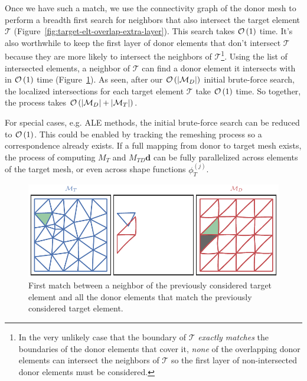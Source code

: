 Once we have such a match, we use the connectivity graph of the
donor mesh to perform a breadth first search
for neighbors that also intersect the target
element \(\mathcal{T}\) (Figure~\ref{fig:target-elt-overlap-extra-layer}).
This search takes \(\mathcal{O}\left(1\right)\) time. It's also worthwhile to keep the first
layer of donor elements that don't intersect \(\mathcal{T}\) because they are
more likely to intersect the neighbors of \(\mathcal{T}\)\footnote{In the
very unlikely case that the boundary of \(\mathcal{T}\)
\emph{exactly matches} the boundaries of the donor elements that cover it,
\emph{none} of the overlapping donor elements can intersect the neighbors of
\(\mathcal{T}\) so the first layer of non-intersected donor
elements must be considered.}. Using the list of intersected elements, a
neighbor of \(\mathcal{T}\) can find a donor element it intersects with in
\(\mathcal{O}\left(1\right)\) time (Figure~\ref{fig:target-elt-neighbor}).
As seen, after our \(\mathcal{O}\left(\left|\mathcal{M}_D\right|\right)\)
initial brute-force search, the localized intersections for each
target element \(\mathcal{T}\) take
\(\mathcal{O}\left(1\right)\) time. So together, the process takes
\(\mathcal{O}\left(\left|\mathcal{M}_D\right| + \left|\mathcal{M}_T\right|\right)\).

For special cases, e.g. ALE methods, the initial brute-force search
can be reduced to \(\mathcal{O}\left(1\right)\). This could be enabled by tracking
the remeshing process so a correspondence already exists. If a full
mapping from donor to target mesh exists, the process of computing
\(M_T\) and \(M_{TD} \bm{d}\) can be fully parallelized across
elements of the target mesh, or even across shape functions
\(\phi_T^{(j)}\).

\begin{figure}
  \includegraphics{../images/solution-transfer/main_figure15.pdf}
  \centering
  \captionsetup{width=.75\linewidth}
  \caption{First match between a neighbor of the previously considered
    target element and all the donor elements that match the
    previously considered target element.}
  \label{fig:target-elt-neighbor}
\end{figure}

